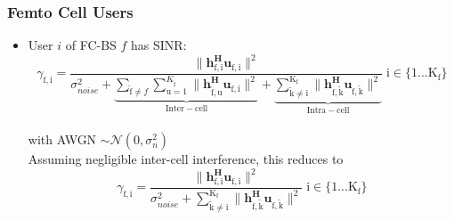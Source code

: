 \documentclass[12pt]{article}
\begin{document}
\subsubsection{Femto Cell Users}
\begin{itemize}



\item User $i$ of FC-BS $f$ has SINR:
	\begin{equation*}
	\gamma_{\mathrm{f,i}} = \frac{\|\mathbf{h^H_{\mathrm{f,i}}u_{\mathrm{f,i}}}\|^2}
	{\sigma^2_{noise}   +
	\underbrace{
	 \sum_{\mathrm{\tilde{f}}\neq f} \sum_{\mathrm{u=1}}^{K_{\mathrm{\tilde{f}}}}
	\|\mathbf{h^H_{\mathrm{\tilde{f},u}}u_{\mathrm{f,i}}}\|^2}_{\mathrm{Inter-cell}}
	 + 
	 \underbrace{
	 \sum_{\mathrm{\tilde{k}\neq i}}^{\mathrm{K_f}}
	 \|\mathbf{h^H_{\mathrm{f,\tilde{k}}}u_{\mathrm{f,\tilde{k}}}}\|^2}_{\mathrm{Intra-cell}}}
	  \; \mathrm{i \in \{1 ... K_f\}}\end{equation*}
\\
with AWGN $\sim \mathcal{N}(0,\sigma^2_n)$
\\

Assuming negligible inter-cell interference, this reduces to
	\begin{equation*}
	\gamma_{\mathrm{f,i}} = \frac{\|\mathbf{h^H_{\mathrm{f,i}}u_{\mathrm{f,i}}}\|^2}
	{\sigma^2_{noise} 
	 + \sum_{\mathrm{\tilde{k}\neq i}}^{\mathrm{K_f}}
	  \|\mathbf{h^H_{\mathrm{f,\tilde{k}}}u_{\mathrm{f,\tilde{k}}}}\|^2}
	  \; \mathrm{i \in \{1 ... K_f\}}
	\end{equation*}
\\

%

\end{itemize}
\end{document}
